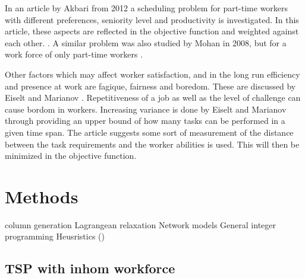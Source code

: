  In an article by Akbari from 2012 a scheduling problem for part-time workers with different preferences, seniority level and productivity is investigated. In this article, these aspects are reflected in the objective function and weighted against each other. \cite{akbari_2012}. A similar problem was also studied by Mohan in 2008, but for a work force of only part-time workers \cite{mohan_2008}. %

Other factors which may affect worker satisfaction, and in the long run efficiency and presence at work are fagique, fairness and boredom. These are discussed by Eiselt and Marianov \cite{eiselt_2006}. Repetitiveness of a job as well as the level of challenge can cause bordom in workers. Increasing variance is done by Eiselt and Marianov through providing an upper bound of how many tasks can be performed in a given time span. The article suggests some sort of measurement of the distance between the task requirements and the worker abilities is used. This will then be minimized in the objective function.


%
%
%


\section{Methods}

column generation
Lagrangean relaxation
Network models
General integer programming
Heusristics (\cite{eiselt_2008})

\subsection{TSP with inhom workforce}

